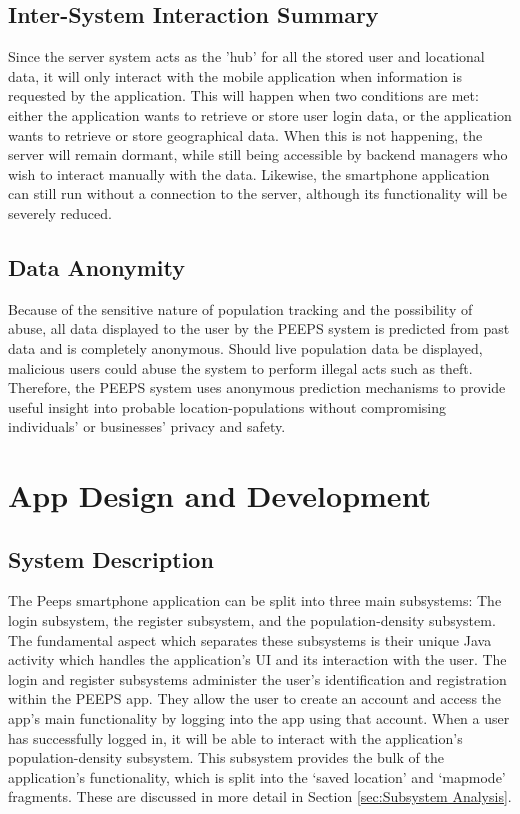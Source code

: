 \subsection{Inter-System Interaction Summary}
\label{sec:Inter-System Interaction Summary}
Since the server system acts as the 'hub' for all the stored user and locational data, it will only interact with the mobile application when information is requested by the application. This will happen when two conditions are met: either the application wants to retrieve or store user login data, or the application wants to retrieve or store geographical data. When this is not happening, the server will remain dormant, while still being accessible by backend managers who wish to interact manually with the data. Likewise, the smartphone application can still run without a connection to the server, although its functionality will be severely reduced. 

\subsection{Data Anonymity}
Because of the sensitive nature of population tracking and the possibility of abuse, all data displayed to the user by the PEEPS system is predicted from past data and is completely anonymous. Should live population data be displayed, malicious users could abuse the system to perform illegal acts such as theft. Therefore, the PEEPS system uses anonymous prediction mechanisms to provide useful insight into probable location-populations without compromising individuals' or businesses' privacy and safety. 

\section{App Design and Development}
\subsection{System Description}
The Peeps smartphone application can be split into three main subsystems: The login subsystem, the register subsystem, and the population-density subsystem. The fundamental aspect which separates these subsystems is their unique Java activity which handles the application's UI and its interaction with the user.  The login and register subsystems administer the user's identification and registration within the PEEPS app. They allow the user to create an account and access the app's main functionality by logging into the app using that account. When a user has successfully logged in, it will be able to interact with the application's population-density subsystem. This subsystem provides the bulk of the application's functionality, which is split into the `saved location' and `mapmode' fragments. These are discussed in more detail in Section \ref{sec:Subsystem Analysis}.

